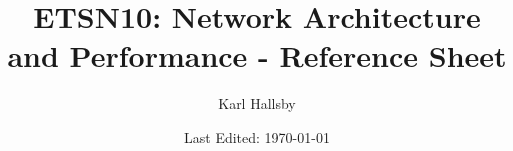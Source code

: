 




\DeclareMathOperator{\Prob}{\operatorname{P}}
\DeclareMathOperator{\Given}{\vert}
\DeclareMathOperator{\ExpectedValue}{\operatorname{\mathbb{E}}}
\DeclareMathOperator{\Variance}{\operatorname{VAR}}
\DeclareMathOperator{\StdDev}{\operatorname{STD}}
\DeclareMathOperator{\Covariance}{\operatorname{Cov}}
\DeclareMathOperator{\CorrCoeff}{\rho}

\newcommand{\SetOrder}[1]{\lvert #1 \rvert}

\begin{titlepage}
  \title{ETSN10: Network Architecture and Performance - Reference Sheet}
  \author{Karl Hallsby}
  \date{Last Edited: \today} %
\end{titlepage}


\maketitle
{} %
\tableofcontents
\clearpage
\listoftheorems[ignoreall, show={definition, Definition}]
\clearpage
{} %









